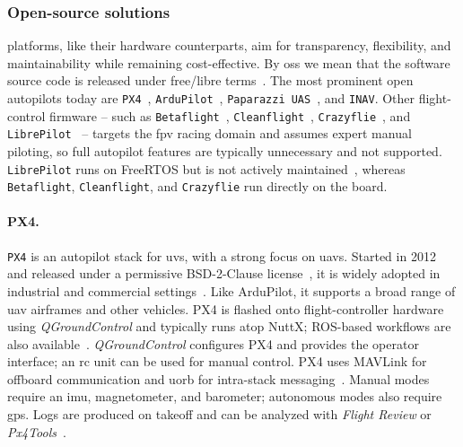 \subsubsection{Open-source solutions}%
\label{sec:open-source-solut-sw}

 platforms, like their hardware counterparts, aim for transparency, flexibility, and maintainability while remaining cost-effective. 
By \gls{oss} we mean that the software source code is released under free/libre terms~\cite{freeGNU}. 
The most prominent open autopilots today are \lstinline|PX4|~\cite{px4-github}, \lstinline|ArduPilot|~\cite{arduPilot-github}, \lstinline|Paparazzi UAS|~\cite{paparazzi-github}, and \lstinline|INAV|. 
Other flight-control firmware -- such as
\lstinline|Betaflight|~\cite{betaflight-github},
\lstinline|Cleanflight|~\cite{cleanflight-github},
\lstinline|Crazyflie|~\cite{crazyflie-home}, and
\lstinline|LibrePilot|~\cite{librePilot-arch} -- targets the \gls{fpv} racing domain and assumes expert manual piloting, so full autopilot features are typically unnecessary and not supported. 
\lstinline|LibrePilot| runs on FreeRTOS but is not actively maintained~\cite{librePilot-github}, whereas \lstinline|Betaflight|, \lstinline|Cleanflight|, and \lstinline|Crazyflie| run directly on the board.

\paragraph{PX4.}
\lstinline|PX4| is an autopilot stack for \glspl{uv}, with a strong focus on \glspl{uav}. 
Started in 2012 and released under a permissive BSD-2-Clause license~\cite{px4-github}, it is widely adopted in industrial and commercial settings~\cite{skynodeX-px4,spRacing-px4}. 
Like ArduPilot, it supports a broad range of \gls{uav} airframes and other vehicles. 
PX4 is flashed onto flight-controller hardware using \emph{QGroundControl} and typically runs atop NuttX; ROS-based workflows are also available~\cite{jargalsaikhan2022architectural}. 
\emph{QGroundControl} configures PX4 and provides the operator interface; an \gls{rc} unit can be used for manual control. 
PX4 uses MAVLink for offboard communication and \gls{uorb} for intra-stack messaging~\cite{px4-sysArch,jargalsaikhan2022architectural}. 
Manual modes require an \gls{imu}, magnetometer, and barometer; autonomous modes also require \gls{gps}. 
Logs are produced on takeoff and can be analyzed with \emph{Flight Review} or \emph{Px4Tools}~\cite{glossner2021overview}.

